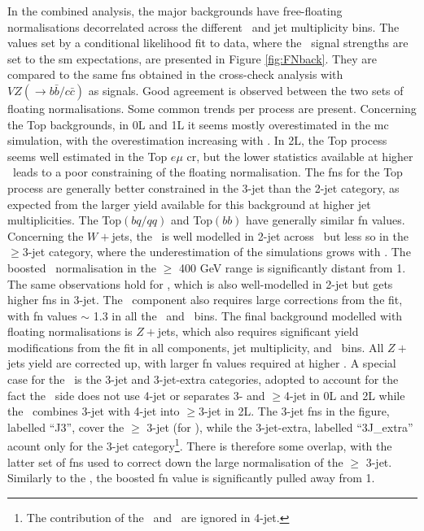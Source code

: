 In the combined analysis, the major backgrounds have free-floating normalisations decorrelated across the different \ptv\ and jet multiplicity bins. The values set by a conditional likelihood fit to data, where the \vhbc\ signal strengths are set to the \gls{sm} expectations, are presented in Figure \ref{fig:FNback}. They are compared to the same \gls{fn}s obtained in the cross-check analysis with $VZ(\rightarrow b\bar{b}/c\bar{c})$ as signals. Good agreement is observed between the two sets of floating normalisations. Some common trends per process are present. Concerning the Top backgrounds, in 0L and 1L it seems mostly overestimated in the \gls{mc} simulation, with the overestimation increasing with \ptv. In 2L, the Top process seems well estimated in the Top $e\mu$ \gls{cr}, but the lower statistics available at higher \ptv\ leads to a poor constraining of the floating normalisation. The \gls{fn}s for the Top process are generally better constrained in the 3-jet than the 2-jet category, as expected from the larger yield available for this background at higher jet multiplicities. The Top$(bq/qq)$ and Top$(bb)$ have generally similar \gls{fn} values. Concerning the $W+$jets, the \whf\ is well modelled in 2-jet across \ptv\ but less so in the $\geq$3-jet category, where the underestimation of the simulations grows with \ptv. The boosted \whf\ normalisation in the $\geq$ 400 GeV range is significantly distant from 1. The same observations hold for \wlf, which is also well-modelled in 2-jet but gets higher \gls{fn}s in 3-jet. The \wmf\ component also requires large corrections from the fit, with \gls{fn} values $\sim$ 1.3 in all the \nj\ and \ptv\ bins. The final background modelled with floating normalisations is $Z+$jets, which also requires significant yield modifications from the fit in all components, jet multiplicity, and \ptv\ bins. All $Z+$jets yield are corrected up, with larger \gls{fn} values required at higher \ptv. A special case for the \zhf\ is the 3-jet and 3-jet-extra categories, adopted to account for the fact the \vhc\ side does not use 4-jet or separates 3- and $\geq$4-jet in 0L and 2L while the \vhb\ combines 3-jet with 4-jet into $\geq$3-jet in 2L. The 3-jet \gls{fn}s in the figure, labelled ``J3'', cover the $\geq$ 3-jet (for \vhb), while the 3-jet-extra, labelled ``3J\_extra'' acount only for the 3-jet category\footnote{The contribution of the \zmf\ and \zlf\ are ignored in 4-jet.}. There is therefore some overlap, with the latter set of \gls{fn}s used to correct down the large normalisation of the $\geq$ 3-jet. Similarly to the \whf, the boosted \zhf \gls{fn} value is significantly pulled away from 1.\\

